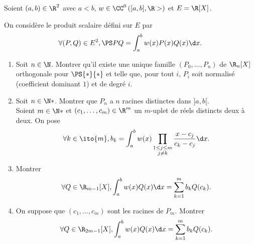\begin{enonce}
\begin{exercise}[ID={RMS122 E255},subtitle={X-ENS PSI 2011},tags={mpsi},difficulty={}]
  Soient $(a,b)\in\R^2$ avec $a<b$, $w\in\CC^0\left( [a,b],\R> \right)$ et $E=\R[X]$.

  On considère le produit scalaire défini sur $E$ par
  \begin{equation*}
	\forall (P,Q)\in E^2, \PS PQ=\int_a^b w(x)P(x)Q(x)\d x.
  \end{equation*}
  \begin{enumerate}
    \item Soit $n\in\N$. Montrer qu'il existe une unique famille $(P_0,\dotsc,P_n)$ de $\R_n[X]$ orthogonale pour $\PS{*}{*}$ et telle que, pour tout $i$, $P_i$ soit normalisé (coefficient dominant $1$) et de degré $i$.

	\item Soit $n\in\N*$.
    Montrer que $P_n$ a $n$ racines distinctes dans $]a,b[$.\\
	  Soient $m\in\N*$ et $(c_1,\dotsc,c_m)\in\R^m$ un $m$-uplet de réels distincts deux à deux.
    On pose
	  \begin{equation*}
		\forall k\in\ito{m}, b_k=\int_a^b w(x)\prod_{\substack{1\leq j\leq m\\ j\neq k}}\frac{x-c_j}{c_k-c_j} \d x.
	  \end{equation*}

	\item
	  Montrer
	  \begin{equation*}
		\forall Q\in\R_{m-1}[X],
		\int_a^b w(x)Q(x)\d x=\sum_{k=1}^m b_kQ(c_k).
	  \end{equation*}
	  
	\item
	  On suppose que $(c_1,\dotsc,c_m)$ sont les racines de $P_m$. Montrer
	  \begin{equation*}
		\forall Q\in\R_{2m-1}[X],
		\int_a^b w(x)Q(x)\d x=\sum_{k=1}^m b_kQ(c_k).
	  \end{equation*}
  \end{enumerate}
\end{exercise}
\begin{solution}
\end{solution}
\end{enonce}
